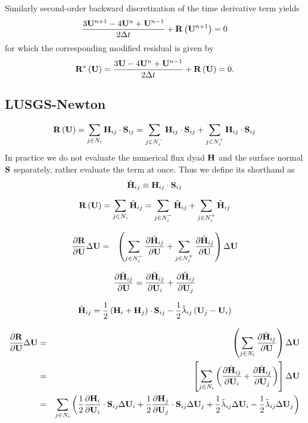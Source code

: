 \documentclass[a4paper]{article}
\begin{document}
Similarly second-order backward discretization of the time derivative term yields
\begin{equation}
\frac{3\mathbf{U}^{n+1} - 4\mathbf{U}^n + \mathbf{U}^{n - 1}}{2\Delta t} + \mathbf{R}\left(\mathbf{U}^{n+1}\right) = 0
\end{equation}
for which the corresponding modified residual is given by
\begin{equation}
\mathbf{R}^*\left(\mathbf{U}\right) =
\frac{3\mathbf{U} - 4\mathbf{U}^n + \mathbf{U}^{n - 1}}{2\Delta t} + \mathbf{R}\left(\mathbf{U}\right) = 0 .
\end{equation}

\subsection{LUSGS-Newton}

\begin{equation}
\mathbf{R}\left(\mathbf{U}\right)
=
\sum_{j \in N_{i}} \mathbf{H}_{ij} \cdot \mathbf{S}_{ij}
=
\sum_{j \in N^-_{i}} \mathbf{H}_{ij} \cdot \mathbf{S}_{ij}
+
\sum_{j \in N^+_{i}} \mathbf{H}_{ij} \cdot \mathbf{S}_{ij}
\end{equation}
In practice we do not evaluate the numerical flux dyad $\mathbf{H}$ and the surface normal $\mathbf{S}$ separately, rather evaluate the term at once. Thus we define its shorthand as
\[
\tilde{\mathbf{H}}_{ij} \equiv \mathbf{H}_{ij} \cdot \mathbf{S}_{ij}
\]

\begin{equation}
\mathbf{R}\left(\mathbf{U}\right)
=
\sum_{j \in N_{i}} \tilde{\mathbf{H}}_{ij}
=
\sum_{j \in N^-_{i}} \tilde{\mathbf{H}}_{ij}
+
\sum_{j \in N^+_{i}} \tilde{\mathbf{H}}_{ij}
\end{equation}

\begin{eqnarray}
\frac{\partial\mathbf{R}}{\partial\mathbf{U}} \Delta\mathbf{U}
&=&
\left(
\sum_{j \in N^-_{i}} \frac{\partial\tilde{\mathbf{H}}_{ij}}{\partial\mathbf{U}}
+
\sum_{j \in N^+_{i}} \frac{\partial\tilde{\mathbf{H}}_{ij}}{\partial\mathbf{U}}
\right)
\Delta\mathbf{U}
\end{eqnarray}

\[
\frac{\partial\tilde{\mathbf{H}}_{ij}}{\partial\mathbf{U}}
=
\frac{\partial\tilde{\mathbf{H}}_{ij}}{\partial\mathbf{U}_i}
+
\frac{\partial\tilde{\mathbf{H}}_{ij}}{\partial\mathbf{U}_j}
\]

\[
\tilde{\mathbf{H}}_{ij}
=
\frac{1}{2}\left(\mathbf{H}_i + \mathbf{H}_j\right) \cdot \mathbf{S}_{ij}
-
\frac{1}{2} \tilde{\lambda}_{ij} \left(\mathbf{U}_j - \mathbf{U}_i\right)
\]

\begin{eqnarray*}
\frac{\partial\mathbf{R}}{\partial\mathbf{U}} \Delta\mathbf{U}
&=&
\left(
\sum_{j \in N_i}
\frac{\partial\tilde{\mathbf{H}}_{ij}}{\partial\mathbf{U}}
\right) \Delta\mathbf{U}
\\
&=&
\left[
\sum_{j \in N_i}
\left(
\frac{\partial\tilde{\mathbf{H}}_{ij}}{\partial\mathbf{U}_i}
+
\frac{\partial\tilde{\mathbf{H}}_{ij}}{\partial\mathbf{U}_j}
\right)
\right] \Delta\mathbf{U}
\\
&=&
\sum_{j \in N_i}
\left(
\frac{1}{2}\frac{\partial\mathbf{H}_i}{\partial\mathbf{U}_i} \cdot \mathbf{S}_{ij} \Delta\mathbf{U}_i
+
\frac{1}{2}\frac{\partial\mathbf{H}_j}{\partial\mathbf{U}_j} \cdot \mathbf{S}_{ij} \Delta\mathbf{U}_j
+
\frac{1}{2}\tilde{\lambda}_{ij} \Delta\mathbf{U}_i
-
\frac{1}{2}\tilde{\lambda}_{ij} \Delta\mathbf{U}_j
\right)
\end{eqnarray*}
\end{document}
